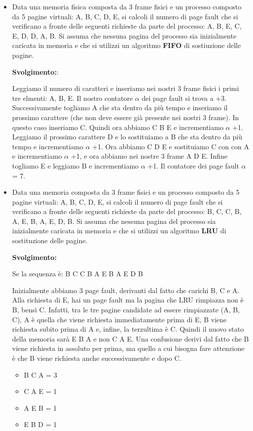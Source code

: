 \documentclass{article}
\begin{document}
\begin{itemize}
    \item Data una memoria fisica composta da 3 frame fisici e un processo composto da 5 pagine virtuali: A, B, C, D, E, si calcoli il numero di page fault che si verificano a fronte delle seguenti richieste da parte del processo: A, B, E, C, E, D, D, A, B. Si assuma che nessuna pagina del processo sia inizialmente caricata in memoria e che si utilizzi un algoritmo \textbf{FIFO} di sostiuzione delle pagine.\par
    \textbf{Svolgimento:}:\par
    Leggiamo il numero di caratteri e inseriamo nei nostri 3 frame fisici i primi tre elmenti: A, B, E. Il nostro contatore $\alpha$ dei page fault si trova a +3. Successivamente togliamo A che sta dentro da più tempo e inseriamo il prossimo carattere (che non deve essere già presente nei nostri 3 frame). In questo caso inseriamo C. Quindi ora abbiamo C B E e incrementiamo $\alpha$ +1. Leggiamo il prossimo carattere D e lo sostituiamo a B che sta dentro da più tempo e incrementiamo $\alpha$ +1. Ora abbiamo C D E e sostituiamo C con con A e incrementiamo $\alpha$ +1, e ora abbiamo nei nostre 3 frame A D E. Infine togliamo E e leggiamo B e incrementiamo $\alpha$ +1. Il contatore dei page fault $\alpha$ = 7.
    \item Data una memoria composta da 3 frame fisici e un processo composto da 5 pagine virtuali: A, B, C, D, E, si calcoli il numero di page fault che si verificano a fronte delle seguenti richieste da parte del processo: B, C, C, B, A, E, B, A, E, D, B. Si assuma che nessuna pagina del processo sia inizialmente caricata in memoria e che si utilizzi un algoritmo \textbf{LRU} di sostituzione delle pagine.\par
    \textbf{Svolgimento:}\par
    Se la sequenza è: B C C B A E B A E D B\par
    Inizialmente abbiamo 3 page fault, derivanti dal fatto che carichi B, C e A.
    Alla richiesta di E, hai un page fault ma la pagina che LRU rimpiazza non è B, bensì C. Infatti, tra le tre pagine candidate ad essere rimpiazzate (A, B, C), A è quella che viene richiesta immediatamente prima di E, B viene richiesta subito prima di A e, infine, la terzultima è C. Quindi il nuovo stato della memoria sarà E B A e non C A E.
    Una confusione derivi dal fatto che B viene richiesta in assoluto per prima, ma quello a cui bisogna fare attenzione è che B viene richiesta anche successivamente e dopo C.\par
    \begin{center}
        \begin{itemize}
            \item B C A = 3
            \item C A E = 1
            \item A E B = 1
            \item E B D = 1
        \end{itemize}
    \end{center}



\end{itemize}
\end{document}
